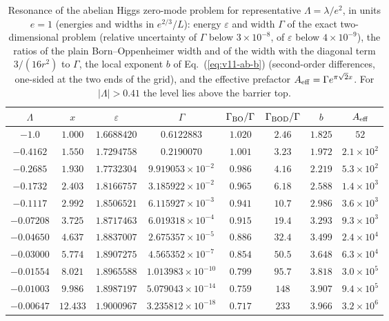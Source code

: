 \begin{table}[t]
\centering
\caption{Resonance of the abelian Higgs zero-mode problem for representative $\Lambda=\lambda/e^2$, in units $e=1$ (energies and widths in $e^{2/3}/L$): energy $\varepsilon$ and width $\Gamma$ of the exact two-dimensional problem (relative uncertainty of $\Gamma$ below $3\times10^{-8}$, of $\varepsilon$ below $4\times10^{-9}$), the ratios of the plain Born--Oppenheimer width and of the width with the diagonal term $3/(16r^2)$ to $\Gamma$, the local exponent $b$ of Eq.~(\ref{eq:v11-ab-b}) (second-order differences, one-sided at the two ends of the grid), and the effective prefactor $A_{\rm eff}=\Gamma e^{\pi\sqrt2x}$. For $|\Lambda|>0.41$ the level lies above the barrier top.} %
\label{tab:v11-ab-widths}
\small
\begin{tabular}{@{}cccccccc@{}}
\toprule
$\Lambda$ & $x$ & $\varepsilon$ & $\Gamma$ & $\Gamma_{\rm BO}/\Gamma$ & $\Gamma_{\rm BOD}/\Gamma$ & $b$ & $A_{\rm eff}$ \\
\midrule
$-1.0$ & $1.000$ & $1.6688420$ & $0.6122883$ & $1.020$ & $2.46$ & $1.825$ & $52$ \\ %
$-0.4162$ & $1.550$ & $1.7294758$ & $0.2190070$ & $1.001$ & $3.23$ & $1.972$ & $2.1\times10^{2}$ \\ %
$-0.2685$ & $1.930$ & $1.7732304$ & $9.919053\times10^{-2}$ & $0.986$ & $4.16$ & $2.219$ & $5.3\times10^{2}$ \\ %
$-0.1732$ & $2.403$ & $1.8166757$ & $3.185922\times10^{-2}$ & $0.965$ & $6.18$ & $2.588$ & $1.4\times10^{3}$ \\ %
$-0.1117$ & $2.992$ & $1.8506521$ & $6.115927\times10^{-3}$ & $0.941$ & $10.7$ & $2.986$ & $3.6\times10^{3}$ \\ %
$-0.07208$ & $3.725$ & $1.8717463$ & $6.019318\times10^{-4}$ & $0.915$ & $19.4$ & $3.293$ & $9.3\times10^{3}$ \\ %
$-0.04650$ & $4.637$ & $1.8837007$ & $2.675357\times10^{-5}$ & $0.886$ & $32.4$ & $3.499$ & $2.4\times10^{4}$ \\ %
$-0.03000$ & $5.774$ & $1.8907275$ & $4.565352\times10^{-7}$ & $0.854$ & $50.5$ & $3.648$ & $6.3\times10^{4}$ \\ %
$-0.01554$ & $8.021$ & $1.8965588$ & $1.013983\times10^{-10}$ & $0.799$ & $95.7$ & $3.818$ & $3.0\times10^{5}$ \\ %
$-0.01003$ & $9.986$ & $1.8987197$ & $5.079043\times10^{-14}$ & $0.759$ & $148$ & $3.907$ & $9.4\times10^{5}$ \\ %
$-0.00647$ & $12.433$ & $1.9000967$ & $3.235812\times10^{-18}$ & $0.717$ & $233$ & $3.966$ & $3.2\times10^{6}$ \\ %
\bottomrule
\end{tabular}
\end{table}

